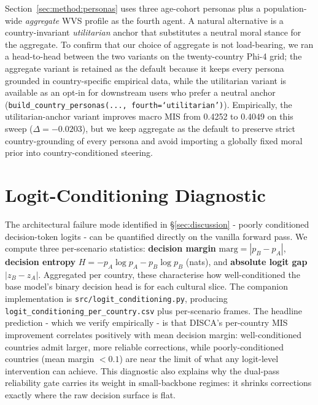 \documentclass{article}
\begin{document}
Section~\ref{sec:method:personas} uses three age-cohort personas plus a
population-wide \emph{aggregate} WVS profile as the fourth agent. A
natural alternative is a country-invariant \emph{utilitarian} anchor that
substitutes a neutral moral stance for the aggregate. To confirm that our
choice of aggregate is not load-bearing, we ran a head-to-head between
the two variants on the twenty-country Phi-4 grid; the aggregate
variant is retained as the default because it keeps every persona
grounded in country-specific empirical data, while the utilitarian
variant is available as an opt-in for downstream users who prefer a
neutral anchor
(\texttt{build\_country\_personas(..., fourth=`utilitarian')}).
Empirically, the utilitarian-anchor variant improves macro MIS from 0.4252
to 0.4049 on this sweep ($\Delta=-0.0203$), but we keep aggregate as the
default to preserve strict country-grounding of every persona and avoid
importing a globally fixed moral prior into country-conditioned steering.

\section{Logit-Conditioning Diagnostic}
\label{app:r2_logit_conditioning}

The architectural failure mode identified in \S\ref{sec:discussion} -
poorly conditioned decision-token logits - can be quantified directly
on the vanilla forward pass. We compute three per-scenario statistics:
\textbf{decision margin} $\mathrm{marg} = |p_B - p_A|$, \textbf{decision
entropy} $H = -p_A \log p_A - p_B \log p_B$ (nats), and
\textbf{absolute logit gap} $|z_B - z_A|$. Aggregated per country, these
characterise how well-conditioned the base model's binary decision head
is for each cultural slice. The companion implementation is
\texttt{src/logit\_conditioning.py}, producing
\texttt{logit\_conditioning\_per\_country.csv} plus per-scenario frames.
The headline prediction - which we verify empirically - is that
DISCA's per-country MIS improvement correlates positively with mean
decision margin: well-conditioned countries admit larger, more reliable
corrections, while poorly-conditioned countries (mean margin $<0.1$) are
near the limit of what any logit-level intervention can achieve. This
diagnostic also explains why the dual-pass reliability gate carries its
weight in small-backbone regimes: it shrinks corrections exactly where
the raw decision surface is flat.
\end{document}
